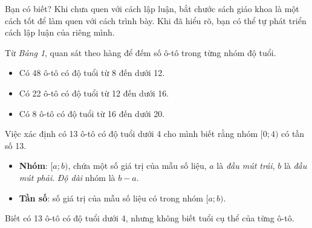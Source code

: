 \documentclass[
  letterpaper,
  DIV=11,
  numbers=noendperiod]{scrartcl}
\providecommand{\tightlist}{%
  \setlength{\itemsep}{0pt}\setlength{\parskip}{0pt}}\usepackage{longtable,booktabs,array}
\begin{document}
\begin{tcolorbox}[enhanced jigsaw, opacityback=0, left=2mm, toprule=.15mm, bottomrule=.15mm, colback=white, title={Mẹo}, toptitle=1mm, colbacktitle=quarto-callout-note-color!10!white, bottomtitle=1mm, breakable, leftrule=.75mm, opacitybacktitle=0.6, coltitle=black, colframe=quarto-callout-note-color-frame, titlerule=0mm, arc=.35mm, rightrule=.15mm]

Bạn có biết? Khi chưa quen với cách lập luận, bắt chước sách giáo khoa
là một cách tốt để làm quen với cách trình bày. Khi đã hiểu rõ, bạn có
thể tự phát triển cách lập luận của riêng mình.

\end{tcolorbox}

Từ \emph{Bảng 1}, quan sát theo hàng để đếm số ô-tô trong từng nhóm độ
tuổi.

\begin{itemize}
\tightlist
\item
  Có 48 ô-tô có độ tuổi từ 8 đến dưới 12.
\item
  Có 22 ô-tô có độ tuổi từ 12 đến dưới 16.
\item
  Có 8 ô-tô có độ tuổi từ 16 đến dưới 20.
\end{itemize}

\begin{tcolorbox}[enhanced jigsaw, opacityback=0, left=2mm, toprule=.15mm, bottomrule=.15mm, colback=white, title={Nhóm \& tần số}, toptitle=1mm, colbacktitle=quarto-callout-note-color!10!white, bottomtitle=1mm, breakable, leftrule=.75mm, opacitybacktitle=0.6, coltitle=black, colframe=quarto-callout-note-color-frame, titlerule=0mm, arc=.35mm, rightrule=.15mm]

Việc xác định có 13 ô-tô có độ tuổi dưới 4 cho mình biết rằng nhóm
\([0;4)\) có tần số 13.

\begin{itemize}
\tightlist
\item
  \textbf{Nhóm}: \([a; b)\), chứa một số giá trị của mẫu số liệu, \(a\)
  là \emph{đầu mút trái}, \(b\) là \emph{đầu mút phải}. \emph{Độ dài}
  nhóm là \(b-a\).
\item
  \textbf{Tần số}: số giá trị của mẫu số liệu có trong nhóm \([a; b)\).
\end{itemize}

Biết có 13 ô-tô có độ tuổi dưới 4, nhưng không biết tuổi cụ thể của từng
ô-tô.

\end{tcolorbox}
\end{document}
